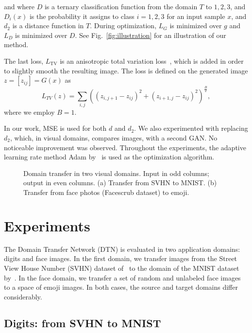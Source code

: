 \documentclass{article} \usepackage{iclr2017_conference,times}
\begin{document}
and where $D$ is a ternary classification function from the domain $T$ to ${1,2,3}$, and $D_i(x)$ is the probability it assigns to class $i=1,2,3$ for an input sample $x$, and $d_2$ is a distance function in $T$. During optimization, $L_G$ is minimized over $g$ and $L_D$ is minimized over $D$. See Fig.~\ref{fig:illustration} for an illustration of our method.

The last loss, $L_{\text{TV}}$ is an anisotropic total variation loss~\citep{TV,Mahendran15}, which is added in order to slightly smooth the resulting image. The loss is defined on the generated image $z=[z_{ij}]=G(x)$ as 
\begin{equation} 
L_{TV}(z) =
 \sum_{i,j}
 \left(
 \left(z_{i,j+1} - z_{ij}\right)^2 +
 \left(z_{i+1,j} - z_{ij}\right)^2
 \right)^\frac{B}{2}, 
\end{equation}
where we employ $B = 1$.

In our work, MSE is used for both $d$ and $d_2$. We also experimented with replacing $d_2$, which, in visual domains, compares images, with a second GAN. No noticeable improvement was observed. Throughout the experiments, the adaptive learning rate method Adam by~\citet{adam} is used as the optimization algorithm. 

\begin{figure}[t]
\centering
{}
\caption{\label{fig:svnhmnistsamples}Domain transfer in two visual domains. Input in odd columns; output in even columns. (a) Transfer from SVHN to MNIST. (b) Transfer from face photos (Facescrub dataset) to emoji.}
\end{figure}

\section{Experiments}
\label{sec:expa}

The Domain Transfer Network (DTN) is evaluated in two application domains: digits and face images. In the first domain, we transfer images from the Street View House Number (SVHN) dataset of~\cite{svhn} to the domain of the MNIST dataset by~\cite{mnist}. In the face domain, we transfer a set of random and unlabeled face images to a space of emoji images. In both cases, the source and target domains differ considerably.

\subsection{Digits: from SVHN to MNIST}
\end{document}
